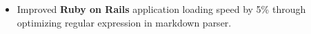 \documentclass[11pt, letterpaper]{simple-cv}
\begin{document}
\begin{itemize}[topsep=0pt]
\item Improved \textbf{Ruby on Rails} application loading speed by 5\% through optimizing regular expression in markdown parser.
\end{itemize}


\end{document}
